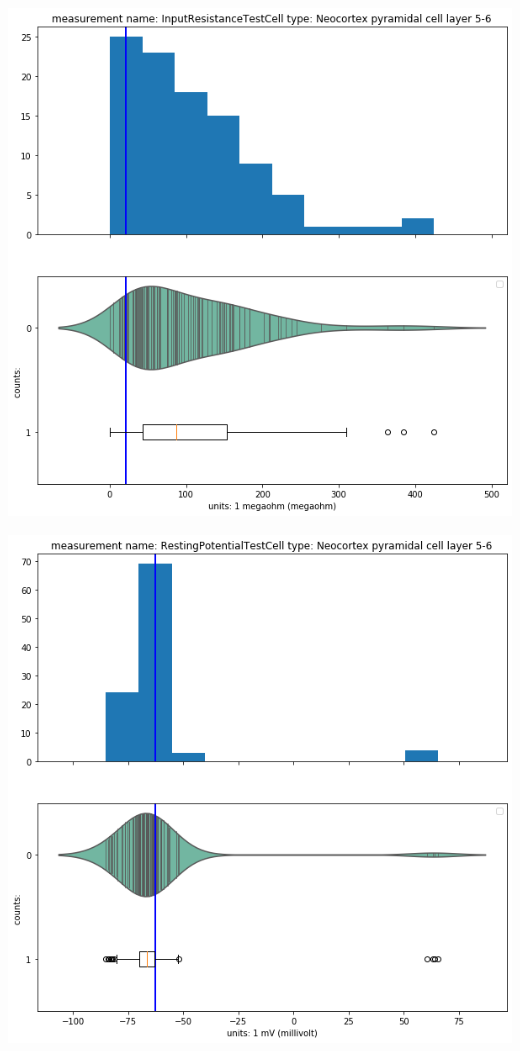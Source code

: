     \begin{center}
   \includegraphics[width=0.7\linewidth]{notebooks_converted/needata_thesis_files/needata_thesis_5_13}
    \end{center}

    \begin{center}
    \includegraphics[width=0.7\linewidth]{notebooks_converted/needata_thesis_files/needata_thesis_5_14}
    \end{center}
    { \hspace*{\fill} \\}
    
